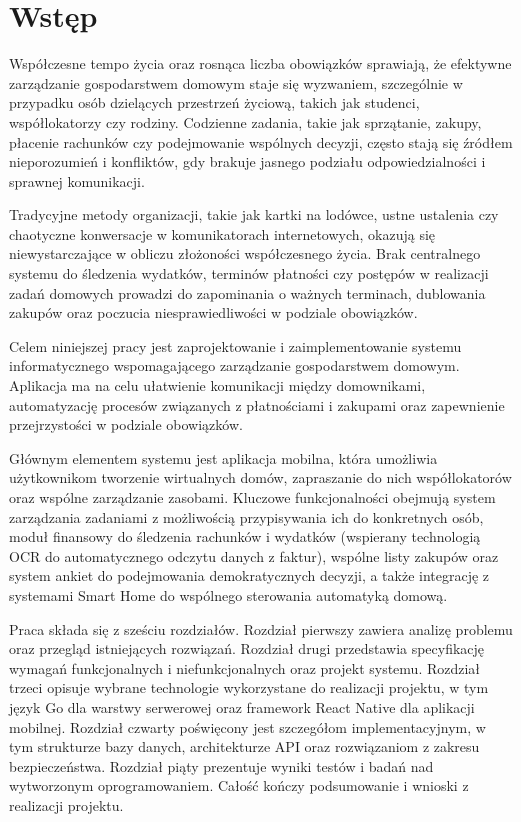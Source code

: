 %


\chapter*{Wstęp}

Współczesne tempo życia oraz rosnąca liczba obowiązków sprawiają, że efektywne zarządzanie gospodarstwem domowym staje się wyzwaniem, szczególnie w przypadku osób dzielących przestrzeń życiową, takich jak studenci, współlokatorzy czy rodziny. Codzienne zadania, takie jak sprzątanie, zakupy, płacenie rachunków czy podejmowanie wspólnych decyzji, często stają się źródłem nieporozumień i konfliktów, gdy brakuje jasnego podziału odpowiedzialności i sprawnej komunikacji.

Tradycyjne metody organizacji, takie jak kartki na lodówce, ustne ustalenia czy chaotyczne konwersacje w komunikatorach internetowych, okazują się niewystarczające w obliczu złożoności współczesnego życia. Brak centralnego systemu do śledzenia wydatków, terminów płatności czy postępów w realizacji zadań domowych prowadzi do zapominania o ważnych terminach, dublowania zakupów oraz poczucia niesprawiedliwości w podziale obowiązków.

Celem niniejszej pracy jest zaprojektowanie i zaimplementowanie systemu informatycznego wspomagającego zarządzanie gospodarstwem domowym. Aplikacja ma na celu ułatwienie komunikacji między domownikami, automatyzację procesów związanych z płatnościami i zakupami oraz zapewnienie przejrzystości w podziale obowiązków.

Głównym elementem systemu jest aplikacja mobilna, która umożliwia użytkownikom tworzenie wirtualnych domów, zapraszanie do nich współlokatorów oraz wspólne zarządzanie zasobami. Kluczowe funkcjonalności obejmują system zarządzania zadaniami z możliwością przypisywania ich do konkretnych osób, moduł finansowy do śledzenia rachunków i wydatków (wspierany technologią OCR do automatycznego odczytu danych z faktur), wspólne listy zakupów oraz system ankiet do podejmowania demokratycznych decyzji, a także integrację z systemami Smart Home do wspólnego sterowania automatyką domową.

Praca składa się z sześciu rozdziałów. Rozdział pierwszy zawiera analizę problemu oraz przegląd istniejących rozwiązań. Rozdział drugi przedstawia specyfikację wymagań funkcjonalnych i niefunkcjonalnych oraz projekt systemu. Rozdział trzeci opisuje wybrane technologie wykorzystane do realizacji projektu, w tym język Go dla warstwy serwerowej oraz framework React Native dla aplikacji mobilnej. Rozdział czwarty poświęcony jest szczegółom implementacyjnym, w tym strukturze bazy danych, architekturze API oraz rozwiązaniom z zakresu bezpieczeństwa. Rozdział piąty prezentuje wyniki testów i badań nad wytworzonym oprogramowaniem. Całość kończy podsumowanie i wnioski z realizacji projektu.